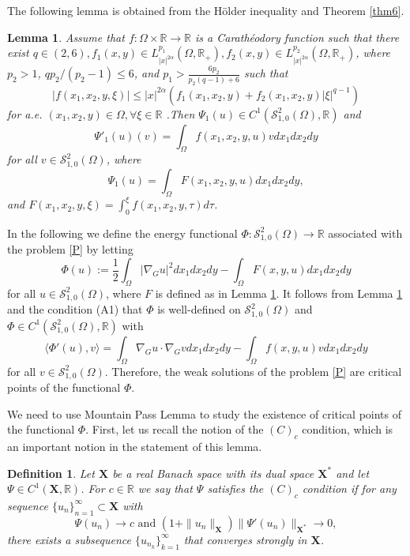 \documentclass[10pt, reqno]{amsart}
\newtheorem{lemma}{Lemma}
\newtheorem{definition}{Definition}
\begin{document}
	The following lemma is obtained from the H\"older inequality and Theorem \ref{thm6}.	
	\begin{lemma}\label{lem4}
		Assume that $f : \Omega \times \mathbb{R} \to \mathbb{R}$ is a Carath\'eodory function such that there exist $q \in (2, 6), f_1(x, y) \in L^{p_1}_{|x|^{2\alpha}}(\Omega, \mathbb{R}_+), f_2(x, y) \in L^{p_2}_{|x|^{2\alpha}}(\Omega, \mathbb{R}_+)$, where $p_2 > 1$, $qp_2/(p_2-1) \leq 6$, and $p_1 > \frac{6p_2}{p_2(q-1)+6}$ such that
		$$|f(x_1,x_2, y, \xi)| \leq |x|^{2\alpha} (f_1(x_1,x_2, y) + f_2(x_1,x_2, y) |\xi|^{q-1})$$
		for a.e.  $(x_1,x_2, y) \in \Omega, \forall \xi \in \mathbb{R}$ .Then $\Psi_1(u) \in C^1(\mathcal{S}^2_{1,0}(\Omega), \mathbb{R})$ and 
		$$\Psi'_1(u)(v) = \int_\Omega f(x_1,x_2, y, u)vdx_1dx_2dy$$
		for all $v \in \mathcal{S}^2_{1,0}(\Omega)$, where
		$$\Psi_1 (u) = \int_\Omega F(x_1,x_2, y, u) dx_1dx_2dy,$$
		and $F(x_1,x_2, y, \xi) =\int_0^\xi f(x_1,x_2, y, \tau)d\tau$.
	\end{lemma}
	
	In the following we define the energy functional $\Phi: \mathcal{S}^2_{1,0}(\Omega) \to \mathbb{R}$ associated with the problem \eqref{P} by letting
	\begin{equation}\label{eqn22}
		\Phi (u) := \dfrac{1}{2}\int_\Omega |\nabla_G u|^2 dx_1dx_2dy - \int_\Omega F(x,y,u)dx_1dx_2dy
	\end{equation}
	for all $u \in \mathcal{S}^2_{1,0}(\Omega)$, where $F$ is defined as in Lemma \ref{lem4}. It follows from Lemma \ref{lem4} and the condition (A1) that $\Phi$ is well-defined on $\mathcal{S}^2_{1,0}(\Omega)$ and $\Phi \in C^1(\mathcal{S}^2_{1,0}(\Omega), \mathbb{R})$ with
	$$\langle\Phi'(u), v \rangle = \int_\Omega \nabla_G u \cdot \nabla_G v dx_1dx_2dy - \int_\Omega f(x,y,u)vdx_1dx_2dy $$
	for all $v \in \mathcal{S}^2_{1,0} (\Omega)$. Therefore, the weak solutions of the problem \eqref{P} are critical points of the functional $\Phi$.
	
	We need to use Mountain Pass Lemma to study the existence of critical points of the functional $\Phi$. First, let us recall the notion of the $(C)_c$ condition, which is an important notion in the statement of this lemma.
	
	\begin{definition}\label{def11}
		Let $\boldsymbol{X}$ be a real Banach space with its dual space $\boldsymbol{X}^*$ and let $\Psi \in C^1(\boldsymbol{X}, \mathbb{R})$. For $c \in \mathbb{R}$ we say that $\Psi$ satisfies the $(C)_c$ condition if for any sequence $\{u_n\}_{n=1}^\infty \subset \boldsymbol{X}$ with 
		$$\Psi(u_n) \to c \textrm{ and  }(1 + \|u_n\|_{\boldsymbol{X}}) \|\Psi'(u_n)\|_{\boldsymbol{X}^*} \to 0,$$
		there exists a subsequence $\{u_{n_k}\}_{k=1}^\infty$ that converges strongly in $\boldsymbol{X}$. 
	\end{definition}
	
\end{document}
